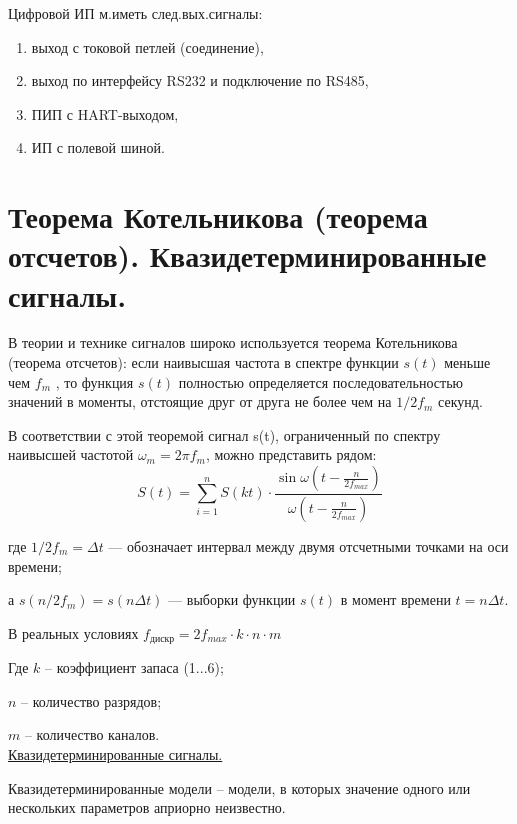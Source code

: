 \documentclass[unicode, 12pt, a4paper, oneside]{article}
\begin{document}
Цифровой ИП м.иметь след.вых.сигналы:
\begin{enumerate}
\item выход с токовой петлей (соединение),
\item выход по интерфейсу RS232 и подключение по RS485,
\item ПИП с HART-выходом,
\item ИП с полевой шиной.
\end{enumerate}

\section{Теорема Котельникова (теорема отсчетов). Квазидетерминированные сигналы.}

В теории и технике сигналов широко используется теорема Котельникова (теорема отсчетов): если наивысшая частота в спектре функции $s(t)$ меньше чем $f_m$ , то функция $s(t)$ полностью определяется последовательностью значений в моменты, отстоящие друг от друга не более чем на $1/2 f_m$ секунд.

В соответствии с этой теоремой сигнал s(t), ограниченный по спектру наивысшей частотой $\omega_m = 2\pi f_m$, можно представить рядом:
\begin{displaymath}
S(t) = \sum_{i=1}^{n}S(kt) \cdot \frac{\sin \omega (t-\frac{n}{2 f_{max}}) }{\omega (t-\frac{n}{2 f_{max}})}
\end{displaymath}
 
где $1/2f_m=\Delta t$ — обозначает интервал между двумя отсчетными точками на оси времени;

а $s(n/2f_m)=s(n\Delta t)$ — выборки функции $s(t)$ в момент времени $t=n\Delta t$.

В реальных условиях $f_\text{дискр} = 2f_{max} \cdot k \cdot n \cdot m$

Где $k$ – коэффициент запаса (1...6);

$n$ – количество разрядов;

$m$ – количество каналов.\\

\underline{Квазидетерминированные сигналы.}

Квазидетерминированные модели – модели, в которых значение одного или нескольких параметров априорно неизвестно.
\end{document}
